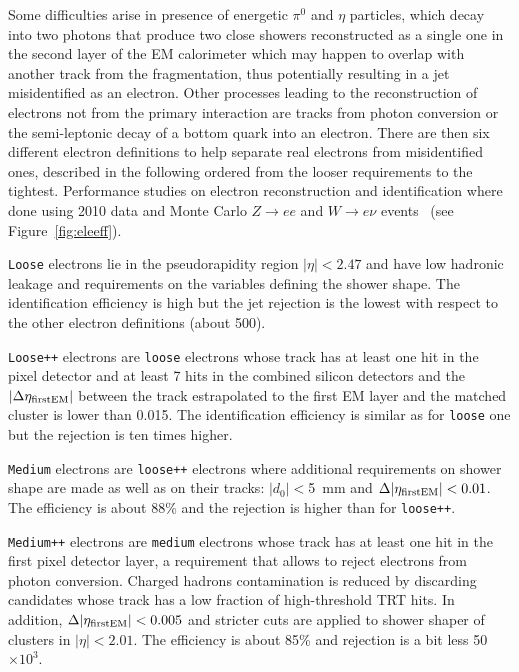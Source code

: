 Some difficulties arise in presence of energetic
$\pi^0$ and $\eta$ particles, 
which decay into two photons that produce two close 
showers reconstructed as a single one in the second layer of the EM
calorimeter which may happen to overlap with another track from the fragmentation, 
thus potentially resulting in a jet misidentified as an electron.
Other processes leading to the reconstruction of electrons 
not from the primary interaction are tracks from photon conversion
or the semi-leptonic decay of a bottom quark into an electron.
There are then six different electron definitions to help 
separate real electrons from misidentified ones,
described in the following ordered from the looser requirements to the tightest.
Performance studies on electron reconstruction and identification where done using 2010 data and Monte
Carlo $Z\to ee$ and $W\to e\nu$ events~\cite{eperf} (see Figure~\ref{fig:eleeff}). 

\texttt{Loose} electrons lie in the pseudorapidity region $|\eta| < 2.47$ and have 
low hadronic leakage and requirements on the variables defining the shower shape.
The identification efficiency is high but the jet rejection is the lowest
with respect to the other electron definitions (about 500).

\texttt{Loose++} electrons are \texttt{loose} electrons whose track has at least one hit in 
the pixel detector and at least 7 hits in the combined silicon detectors and the
$|\Delta\eta_{\rm first EM}|$ between the track estrapolated to the first EM layer and
the matched cluster is lower than 0.015. The identification
efficiency is similar as for \texttt{loose} one but the rejection is ten times higher.

\texttt{Medium} electrons are \texttt{loose++} electrons where additional requirements on shower shape
are made as well as on their tracks: $|d_0|<$5~mm and $\Delta|\eta_{\rm first EM}|<0.01$.
The efficiency is about 88\% and the rejection is
higher than for \texttt{loose++}.

\texttt{Medium++} electrons are \texttt{medium} electrons whose track has at least one hit in the
first pixel detector layer, a requirement that allows to reject electrons from
photon conversion. Charged hadrons contamination is reduced by discarding candidates
whose track has a low fraction of high-threshold TRT hits. In addition, $\Delta|\eta_{\rm first EM}|<0.005$ 
and stricter cuts are applied to shower shaper of clusters in $|\eta|<2.01$. The
efficiency is about 85\% and rejection is a bit less 50$\times 10^3$.


